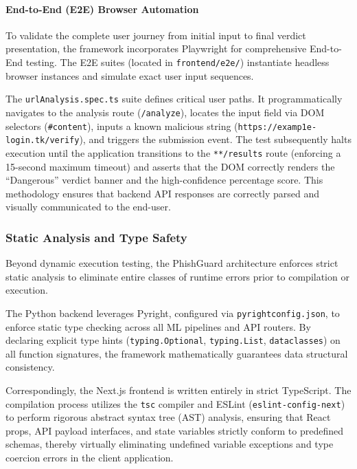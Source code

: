 \paragraph{End-to-End (E2E) Browser
Automation}\label{end-to-end-e2e-browser-automation}

To validate the complete user journey from initial input to final
verdict presentation, the framework incorporates Playwright for
comprehensive End-to-End testing. The E2E suites (located in
\texttt{frontend/e2e/}) instantiate headless browser instances and
simulate exact user input sequences.

The \texttt{urlAnalysis.spec.ts} suite defines critical user paths. It
programmatically navigates to the analysis route (\texttt{/analyze}),
locates the input field via DOM selectors (\texttt{\#content}), inputs a
known malicious string (\texttt{https://examp1e-login.tk/verify}), and
triggers the submission event. The test subsequently halts execution
until the application transitions to the \texttt{**/results} route
(enforcing a 15-second maximum timeout) and asserts that the DOM
correctly renders the ``Dangerous'' verdict banner and the
high-confidence percentage score. This methodology ensures that backend
API responses are correctly parsed and visually communicated to the
end-user.

\subsubsection{Static Analysis and Type
Safety}\label{static-analysis-and-type-safety}

Beyond dynamic execution testing, the PhishGuard architecture enforces
strict static analysis to eliminate entire classes of runtime errors
prior to compilation or execution.

The Python backend leverages Pyright, configured via
\texttt{pyrightconfig.json}, to enforce static type checking across all
ML pipelines and API routers. By declaring explicit type hints
(\texttt{typing.Optional}, \texttt{typing.List}, \texttt{dataclasses})
on all function signatures, the framework mathematically guarantees data
structural consistency.

Correspondingly, the Next.js frontend is written entirely in strict
TypeScript. The compilation process utilizes the \texttt{tsc} compiler
and ESLint (\texttt{eslint-config-next}) to perform rigorous abstract
syntax tree (AST) analysis, ensuring that React props, API payload
interfaces, and state variables strictly conform to predefined schemas,
thereby virtually eliminating undefined variable exceptions and type
coercion errors in the client application.

